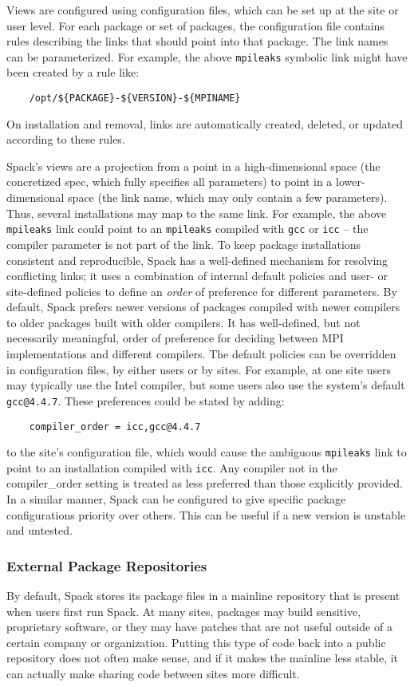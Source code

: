 Views are configured using configuration files, which can be set up at the site or
user level.
For each package or set of packages, the configuration file contains rules
describing the links that should point into that package.
The link names can be parameterized.
For example, the above {\tt mpileaks} symbolic link might have been created by a rule like:
%
\begin{verbatim}
    /opt/${PACKAGE}-${VERSION}-${MPINAME}
\end{verbatim}
%
On installation and removal,
links are automatically created, deleted, or updated according to these rules.

Spack's views are a projection from a point in a high-dimensional space
(the concretized spec, which fully specifies all parameters) to point
in a lower-dimensional space
(the link name, which may only contain a few parameters).
Thus, several installations may map to the same link.
For example, the above {\tt mpileaks} link could point to an {\tt mpileaks} compiled with
{\tt gcc} or {\tt icc} -- the compiler parameter is not part of the link.
To keep  package installations consistent and reproducible,
Spack has a well-defined mechanism for resolving conflicting links;
it uses a combination of internal default policies and user- or site-defined
policies to define an {\it order} of preference for different parameters.
By default, Spack prefers newer versions of packages compiled with newer compilers
to older packages built with older compilers. It has well-defined, but not
necessarily meaningful, order of preference for deciding between MPI
implementations and different compilers.
The default policies can be overridden in configuration files, by either users
or by sites. For example, at one site users may typically use the Intel compiler,
but some users also use the system's default {\tt gcc@4.4.7}.
These preferences could be stated by adding:
%
\begin{verbatim}
    compiler_order = icc,gcc@4.4.7
\end{verbatim}
%
to the site's configuration file, which would cause the ambiguous
{\tt mpileaks} link to point to an installation compiled with {\tt icc}.
Any compiler not in the compiler\_order setting is treated as less preferred
than those explicitly provided.
%
In a similar manner, Spack can be configured to give specific package
configurations priority over others.
This can be useful if a new version is unstable and untested.

\subsubsection{External Package Repositories}
By default, Spack stores its package files in a mainline repository
that is present when users
first run Spack.  At many sites, packages may build sensitive,
proprietary software, or they
may have patches that are not useful outside of a certain company or
organization.  Putting this type of code back into a public repository
does not often make sense, and if it makes the
mainline less stable, it can actually make sharing code between sites more difficult.

